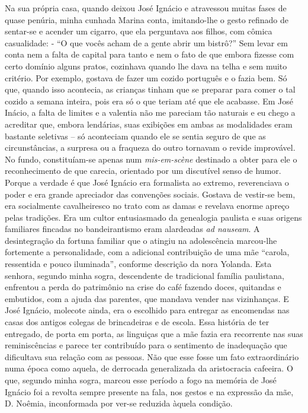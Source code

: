 Na sua própria casa, quando deixou José Ignácio e atravessou muitas fases de quase penúria, minha cunhada Marina conta, imitando-lhe o gesto refinado de sentar-se e acender um cigarro, que ela perguntava aos filhos, com cômica casualidade: - ``O que vocês acham de a gente abrir um bistrô?'' Sem levar em conta nem a falta de capital para tanto e nem o fato de que embora fizesse com certo domínio alguns pratos, cozinhava quando lhe dava na telha e sem muito critério.
Por exemplo, gostava de fazer um cozido português e o fazia bem.
Só que, quando isso acontecia, as crianças tinham que se preparar para comer o tal cozido a semana inteira, pois era só o que teriam até que ele acabasse.
Em José Inácio, a falta de limites e a valentia não me pareciam tão naturais e eu chego a acreditar que, embora lendárias, suas exibições em ambas as modalidades eram bastante seletivas -- só aconteciam quando ele se sentia seguro de que as circunstâncias, a surpresa ou a fraqueza do outro tornavam o revide improvável.
No fundo, constituíam-se apenas num \textit{mis-em-scène} destinado a obter para ele o reconhecimento de que carecia, orientado por um discutível senso de humor.
Porque a verdade é que José Ignácio era formalista ao extremo, reverenciava o poder e era grande apreciador das convenções sociais.
Gostava de vestir-se bem, era socialmente cavalheiresco no trato com as damas e revelava enorme apreço pelas tradições.
Era um cultor entusiasmado da genealogia paulista e suas origens familiares fincadas no bandeirantismo eram alardeadas \textit{ad nauseam}.
A desintegração da fortuna familiar que o atingiu na adolescência marcou-lhe fortemente a personalidade, com a adicional contribuição de uma mãe ``carola, ressentida e pouco iluminada'', conforme descrição da nora Yolanda.
Esta senhora, segundo minha sogra, descendente de tradicional família paulistana, enfrentou a perda do patrimônio na crise do café fazendo doces, quitandas e embutidos, com a ajuda das parentes, que mandava vender nas vizinhanças.
E José Ignácio, molecote ainda, era o escolhido para entregar as encomendas nas casas dos antigos colegas de brincadeiras e de escola.
Essa história de ter entregado, de porta em porta, as linguiças que a mãe fazia era recorrente nas suas reminiscências e parece ter contribuído para o sentimento de inadequação que dificultava sua relação com as pessoas.
Não que esse fosse um fato extraordinário numa época como aquela, de derrocada generalizada da aristocracia cafeeira.
O que, segundo minha sogra, marcou esse período a fogo na memória de José Ignácio foi a revolta sempre presente na fala, nos gestos e na expressão da mãe, D. Noêmia, inconformada por ver-se reduzida àquela condição.
